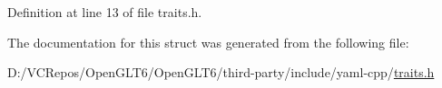 Definition at line 13 of file traits.\+h.



The documentation for this struct was generated from the following file\+:\begin{DoxyCompactItemize}
\item 
D\+:/\+V\+C\+Repos/\+Open\+G\+L\+T6/\+Open\+G\+L\+T6/third-\/party/include/yaml-\/cpp/\mbox{\hyperlink{traits_8h}{traits.\+h}}\end{DoxyCompactItemize}
